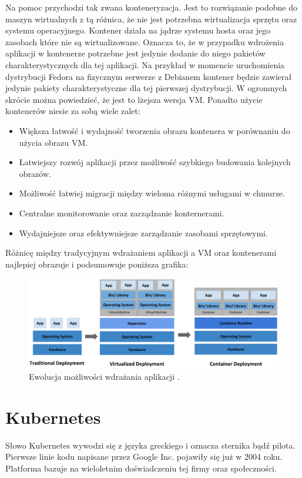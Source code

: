 \documentclass[pl,final,oneside]{mgr} %
\begin{document}
Na pomoc przychodzi tak zwana konteneryzacja. Jest to rozwiązanie podobne do maszyn wirtualnych z tą różnica, że nie jest potrzebna wirtualizacja sprzętu oraz systemu operacyjnego. Kontener działa na jądrze systemu hosta oraz jego zasobach które nie są wirtualizowane. Oznacza to, że w przypadku wdrożenia aplikacji w kontenerze potrzebne jest jedynie dodanie do niego pakietów charakterystycznych dla tej aplikacji. Na przykład w momencie uruchomienia dystrybucji Fedora na fizycznym serwerze z Debianem kontener będzie zawierał jedynie pakiety charakterystyczne dla tej pierwszej dystrybucji. W ogromnych skrócie można powiedzieć, że jest to lżejsza wersja VM. Ponadto użycie kontenerów niesie za sobą wiele zalet:
\begin{itemize}
	\item Większa łatwość i wydajność tworzenia obrazu kontenera w porównaniu do użycia obrazu VM.
	\item Łatwiejszy rozwój aplikacji przez możliwość szybkiego budowania kolejnych obrazów.
	\item Możliwość łatwiej migracji między wieloma różnymi usługami w chmurze.
	\item Centralne monitorowanie oraz zarządzanie konternerami.
	\item Wydajniejsze oraz efektywniejsze zarządzanie zasobami sprzętowymi.
	
\end{itemize}
Różnicę między tradycyjnym wdrażaniem aplikacji a VM oraz kontenerami najlepiej obrazuje i podsumowuje poniższa grafika: 
\begin{figure}[h!]
	\centering
	\includegraphics[width=1\linewidth]{images/container_evolution}
	\caption{Ewolucja możliwości wdrażania aplikacji \cite{kube_doku}.}
	\label{fig:container_evolution}
\end{figure}
\section{Kubernetes}
Słowo Kubernetes wywodzi się z języka greckiego i oznacza sternika bądź pilota. Pierwsze linie kodu napisane przez Google Inc. pojawiły się już w 2004 roku. Platforma bazuje na wieloletnim doświadczeniu tej firmy oraz społeczności.
\end{document}
